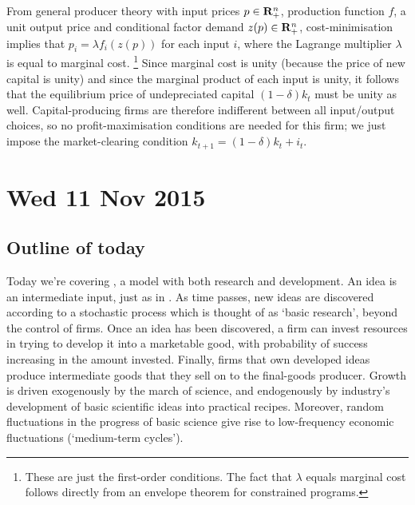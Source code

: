 \documentclass[11pt,letterpaper,reqno,oneside]{article}
\begin{document}
From general producer theory with input prices $p \in \mathbf{R}^n_+$, production function $f$, a unit output price and conditional factor demand $z(p) \in \mathbf{R}^n_+$, cost-minimisation implies that $p_i = \lambda f_i(z(p))$ for each input $i$, where the Lagrange multiplier $\lambda$ is equal to marginal cost.%
	\footnote{These are just the first-order conditions. The fact that $\lambda$ equals marginal cost follows directly from an envelope theorem for constrained programs.}
Since marginal cost is unity (because the price of new capital is unity) and since the marginal product of each input is unity, it follows that the equilibrium price of undepreciated capital $(1-\delta)k_t$ must be unity as well. Capital-producing firms are therefore indifferent between all input/output choices, so no profit-maximisation conditions are needed for this firm; we just impose the market-clearing condition $k_{t+1} = (1-\delta)k_t + i_t$.



\pagebreak
\section{Wed 11 Nov 2015}
\label{sec:11Nov2015}


\subsection{Outline of today}
\label{sec:11Nov2015:outline_of_today}

Today we're covering \textcite{CominGertler2006}, a model with both research and development. An idea is an intermediate input, just as in \textcite{Romer1987}. As time passes, new ideas are discovered according to a stochastic process which is thought of as `basic research', beyond the control of firms. Once an idea has been discovered, a firm can invest resources in trying to develop it into a marketable good, with probability of success increasing in the amount invested. Finally, firms that own developed ideas produce intermediate goods that they sell on to the final-goods producer. Growth is driven exogenously by the march of science, and endogenously by industry's development of basic scientific ideas into practical recipes. Moreover, random fluctuations in the progress of basic science give rise to low-frequency economic fluctuations (`medium-term cycles').
\end{document}
